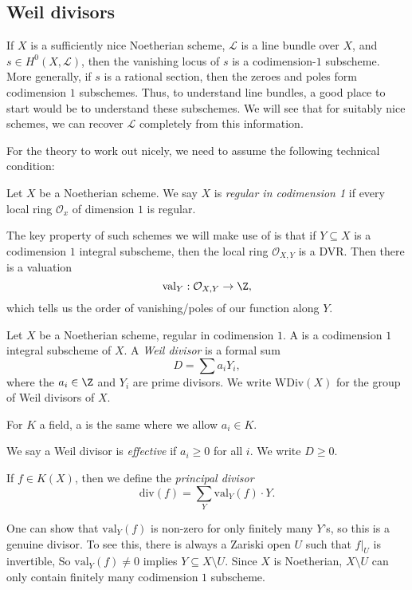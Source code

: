 \documentclass[a4paper]{article}
\newcommand\val{\mathrm{val}}
\renewcommand\div{\mathrm{div}}
\newcommand\WDiv{\mathrm{WDiv}}
\begin{document}
\subsection{Weil divisors}
If $X$ is a sufficiently nice Noetherian scheme, $\mathcal{L}$ is a line bundle over $X$, and $s \in H^0(X, \mathcal{L})$, then the vanishing locus of $s$ is a codimension-$1$ subscheme. More generally, if $s$ is a rational section, then the zeroes and poles form codimension $1$ subschemes. Thus, to understand line bundles, a good place to start would be to understand these subschemes. We will see that for suitably nice schemes, we can recover $\mathcal{L}$ completely from this information.

For the theory to work out nicely, we need to assume the following technical condition:
\begin{defi}
  Let $X$ be a Noetherian scheme. We say $X$ is \emph{regular in codimension 1} if every local ring $\mathcal{O}_x$ of dimension $1$ is regular.
\end{defi}
The key property of such schemes we will make use of is that if $Y \subseteq X$ is a codimension $1$ integral subscheme, then the local ring $\mathcal{O}_{X, Y}$ is a DVR. Then there is a valuation
\[
  \val_Y: \mathcal{O}_{X, Y} \to \Z,
\]
which tells us the order of vanishing/poles of our function along $Y$.

\begin{defi}
  Let $X$ be a Noetherian scheme, regular in codimension $1$. A  is a codimension $1$ integral subscheme of $X$. A \emph{Weil divisor} is a formal sum
  \[
    D = \sum a_i Y_i,
  \]
  where the $a_i \in \Z$ and $Y_i$ are prime divisors. We write $\WDiv(X)$ for the group of Weil divisors of $X$.

  For $K$ a field, a  is the same where we allow $a_i \in K$.
\end{defi}

\begin{defi}
  We say a Weil divisor is \emph{effective} if $a_i \geq 0$ for all $i$. We write $D \geq 0$.
\end{defi}

\begin{defi}
  If $f \in K(X)$, then we define the \emph{principal divisor}
  \[
    \div(f) = \sum_{Y} \val_Y(f) \cdot Y.
  \]
\end{defi}
One can show that $\val_Y(f)$ is non-zero for only finitely many $Y$'s, so this is a genuine divisor. To see this, there is always a Zariski open $U$ such that $f|_U$ is invertible, So $\val_Y(f) \not= 0$ implies $Y \subseteq X \setminus U$. Since $X$ is Noetherian, $X \setminus U$ can only contain finitely many codimension $1$ subscheme.
\end{document}
